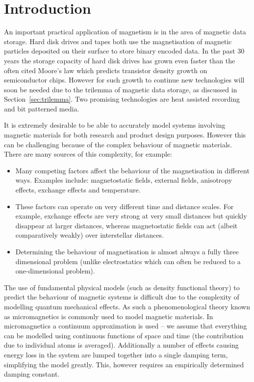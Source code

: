 
\section{Introduction}
\label{sec:introduction}

An important practical application of magnetism is in the area of magnetic data storage. Hard disk drives and tapes both use the magnetisation of magnetic particles deposited on their surface to store binary encoded data. In the past 30 years the storage capacity of hard disk drives has grown even faster than the often cited Moore's law which predicts transistor density growth on semiconductor chips. \cite{McDaniel2005} However for such growth to continue new technologies will soon be needed due to the trilemma of magnetic data storage, as discussed in Section~\ref{sec:trilemma}. Two promising technologies are heat assisted recording and bit patterned media.

It is extremely desirable to be able to accurately model systems involving magnetic materials for both research and product design purposes. However this can be challenging because of the complex behaviour of magnetic materials. There are many sources of this complexity, for example:
\begin{itemize}
\item Many competing factors affect the behaviour of the magnetisation in different ways. Examples include: magnetostatic fields, external fields, anisotropy effects, exchange effects and temperature.

\item These factors can operate on very different time and distance scales. For example, exchange effects are very strong at very small distances but quickly disappear at larger distances, whereas magnetostatic fields can act (albeit comparatively weakly) over interstellar distances.

\item Determining the behaviour of magnetisation is almost always a fully three dimensional problem (unlike electrostatics which can often be reduced to a one-dimensional problem).
\end{itemize}

The use of fundamental physical models (such as density functional theory) to predict the behaviour of magnetic systems is difficult due to the complexity of modelling quantum mechanical effects. As such a phenomenological theory known as micromagnetics is commonly used to model magnetic materials.\cite{Coey2010} \cite{Kronmuller2003} In micromagnetics a continuum approximation is used -- we assume that everything can be modelled using continuous functions of space and time (the contribution due to individual atoms is averaged). Additionally a number of effects causing energy loss in the system are lumped together into a single damping term, simplifying the model greatly. This, however requires an empirically determined damping constant.

